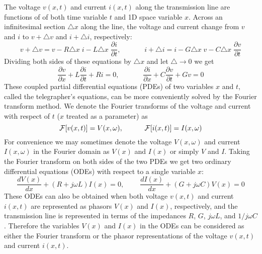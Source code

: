 The voltage $v(x,t)$ and current $i(x,t)$ along the transmission line are 
functions of of both time variable $t$ and 1D space variable $x$. Across 
an infinitesimal section $\triangle x$ along the line, the voltage and 
current change from $v$ and $i$ to $v+\triangle v$ and 
$i+\triangle i$, respectively: 
\[ v+\triangle v=v-R\triangle x\; i-L\triangle x \;\frac{\partial i}{\partial t},
\;\;\;\;\;\;\;\;\;\;\;\;
i+\triangle i=i-G\triangle x\; v-C\triangle x\; \frac{\partial v}{\partial t} \]
Dividing both sides of these equations by $\triangle x$ and let $\triangle\rightarrow 0$
we get
\[
\frac{\partial v}{\partial x}+L \frac{\partial i}{\partial t}+Ri=0,
\;\;\;\;\;\;\;\;\;\;\;\;
\frac{\partial i}{\partial x}+C \frac{\partial v}{\partial t}+Gv=0
\]
These coupled partial differential equations (PDEs) of two variables $x$ and 
$t$, called the telegrapher's equations, can be more conveniently solved by 
the Fourier transform method. We denote the Fourier transforms of the voltage
and current with respect of $t$ ($x$ treated as a parameter) as
\[ {\cal F}[v(x,t)]=V(x,\omega),\;\;\;\;\;\;\;\;\;\;\;{\cal F}[i(x,t)]=I(x,\omega) \]
For convenience we may sometimes denote the voltage $V(x,\omega)$ and current 
$I(x,\omega)$ in the Fourier domain as $V(x)$ and $I(x)$ or simply $V$ and $I$.
Taking the Fourier transform on both sides of the two PDEs we get two ordinary 
differential equations (ODEs) with respect to a single variable $x$:
\[
\frac{dV(x)}{dx}+(R+j\omega L)I(x)=0,
\;\;\;\;\;\;\;\;\frac{dI(x)}{dx}+(G+j\omega C)V(x)=0 
\]
These ODEs can also be obtained when both voltage $v(x,t)$ and current $i(x,t)$ 
are represented as phasors $V(x)$ and $I(x)$, respectively, and the transmission 
line is represented in terms of the impedances $R$, $G$, $j\omega L$, and 
$1/j\omega C$. Therefore the variables $V(x)$ and $I(x)$ in the ODEs can be 
considered as either the Fourier transform or the phasor representations of 
the voltage $v(x,t)$ and current $i(x,t)$.

